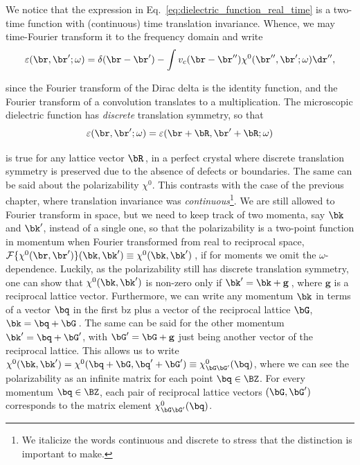 We notice that the expression in Eq.~\eqref{eq:dielectric_function_real_time} is a two-time function with (continuous) time translation invariance.
Whence, we may time-Fourier transform it to the frequency domain and write
\vspace{-0.2cm}
\begin{equation}
    \label{eq:dielectric_function_real_frequency}
    \varepsilon (\br,\br';\omega) = \delta(\br - \br') - \int   v_c(\br - \br'') \chi^0 (\br'',\br';\omega) \dr''  ,
\end{equation}

\noindent since the Fourier transform of the Dirac delta is the identity function, and the Fourier transform of a convolution translates to a multiplication.
The microscopic dielectric function has \textit{discrete} translation symmetry, so that
\vspace{-0.2cm}
\begin{equation}
    \varepsilon (\br,\br';\omega) = \varepsilon (\br + \bR,\br' + \bR;\omega)
\end{equation}

\noindent is true for any lattice vector $\bR$\,, in a perfect crystal where discrete translation symmetry is preserved due to the absence of defects or boundaries.
The same can be said about the polarizability $\chi^0$.
This contrasts with the case of the previous chapter, where translation invariance was \textit{continuous}\footnote{We italicize the words continuous and discrete to stress that the distinction is important to make.}.
We are still allowed to Fourier transform in space, but we need to keep track of two momenta, say $\bk$ and $\bk'$, instead of a single one, so that the polarizability is a two-point function in momentum when Fourier transformed from real to reciprocal space, $\mathcal{F}\{\chi^0(\br,\br')\} (\bk,\bk') \equiv \chi^0(\bk,\bk')$\,, if for moments we omit the $\omega$-dependence.
Luckily, as the polarizability still has discrete translation symmetry, one can show that $\chi^0(\bk,\bk')$ is non-zero only if $\bk' = \bk + \mathbf{g}$\,, where $\mathbf{g}$ is a reciprocal lattice vector.
Furthermore, we can write any momentum $\bk$ in terms of a vector $\bq$ in the first \gls{bz} plus a vector of the reciprocal lattice $\bG$, $\bk = \bq + \bG$\,.
The same can be said for the other momentum $\bk' = \bq + \bG'$, with $\bG' = \bG + \mathbf{g}$ just being another vector of the reciprocal lattice.
This allows us to write $\chi^0(\bk,\bk') = \chi^0(\bq + \bG,\bq' + \bG') \equiv \chi^0_{\bG \bG'}(\bq)$, where we can see the polarizability as an infinite matrix for each point $\bq \in \BZ$.
For every momentum $\bq \in \BZ$, each pair of reciprocal lattice vectors $(\bG,\bG')$ corresponds to the matrix element $\chi^0_{\bG \bG'}(\bq)$.

